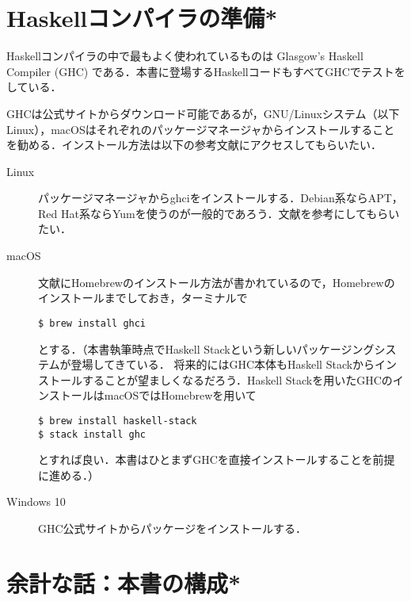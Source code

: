 \documentclass[a4paper,draft]{jsbook}
\newcommand{\programminglanguage}[1]{\textsf{#1}}
\newcommand{\haskell}{\programminglanguage{Haskell}}
\newcommand{\keyword}[1]{{\underline{\emph{#1}}}}
\begin{document}



\section{\haskell コンパイラの準備*}

\haskell コンパイラの中で最もよく使われているものは Glasgow's Haskell Compiler (GHC) である．本書に登場する\haskell コードもすべてGHCでテストをしている．

GHCは公式サイト\cite{haskellplatform}からダウンロード可能であるが，GNU/Linuxシステム（以下Linux），macOSはそれぞれのパッケージマネージャからインストールすることを勧める．インストール方法は以下の参考文献にアクセスしてもらいたい．
\begin{description}
\item[Linux] パッケージマネージャからghciをインストールする．Debian系ならAPT，Red Hat系ならYumを使うのが一般的であろう．文献\cite{linux}を参考にしてもらいたい．
\item[macOS] 文献\cite{osx}にHomebrewのインストール方法が書かれているので，Homebrewのインストールまでしておき，ターミナルで
\begin{verbatim}
$ brew install ghci
\end{verbatim} %
とする．（本書執筆時点でHaskell Stackという新しいパッケージングシステムが登場してきている．
将来的にはGHC本体もHaskell Stackからインストールすることが望ましくなるだろう．Haskell Stackを用いたGHCのインストールはmacOSではHomebrewを用いて
\begin{verbatim}
$ brew install haskell-stack
$ stack install ghc
\end{verbatim} %
とすれば良い．本書はひとまずGHCを直接インストールすることを前提に進める．）
\item[Windows 10] GHC公式サイト\cite{haskellplatform}からパッケージをインストールする．
\end{description}

\section{余計な話：本書の構成*}
\end{document}
